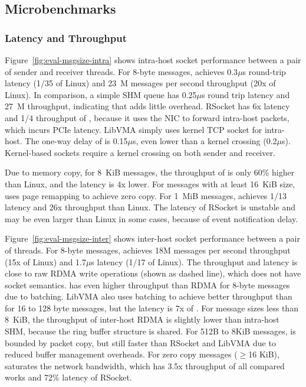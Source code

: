 \subsection{Microbenchmarks}
\label{subsec:microbenchmark}

\subsubsection{Latency and Throughput}
\quad



Figure~\ref{fig:eval-msgsize-intra} shows intra-host socket performance between a pair of sender and receiver threads.
For 8-byte messages, \sys achieves 0.3$\mu$s round-trip latency (1/35 of Linux) and 23~M messages per second throughput (20x of Linux).
In comparison, a simple SHM queue has 0.25$\mu$s round trip latency and 27~M throughput, indicating that \sys adds little overhead.
RSocket has 6x latency and 1/4 throughput of \sys{}, because it uses the NIC to forward intra-host packets, which incurs PCIe latency.
LibVMA simply uses kernel TCP socket for intra-host.
The one-way delay of \sys{} is 0.15$\mu$s, even lower than a kernel crossing (0.2$\mu$s). Kernel-based sockets require a kernel crossing on both sender and receiver.

Due to memory copy, for 8~KiB messages, the throughput of \sys is only 60\% higher than Linux, and the latency is 4x lower. For messages with at least 16~KiB size, \sys uses page remapping to achieve zero copy.
For 1~MiB messages, \sys achieves 1/13 latency and 26x throughput than Linux.
The latency of RSocket is unstable and may be even larger than Linux in some cases, because of event notification delay.


Figure~\ref{fig:eval-msgsize-inter} shows inter-host socket performance between a pair of threads.
For 8-byte messages, \sys achieves 18M messages per second throughput (15x of Linux) and 1.7$\mu$s latency (1/17 of Linux).
The throughput and latency is close to raw RDMA write operations (shown as dashed line), which does not have socket semantics.
\sys{} has even higher throughput than RDMA for 8-byte messages due to batching.
LibVMA also uses batching to achieve better throughput than \sys{} for 16 to 128 byte messages, but the latency is 7x of \sys{}.
For message sizes less than 8~KiB, the throughput of inter-host RDMA is  slightly lower than intra-host SHM, because the ring buffer structure is shared.
For 512B to 8KiB messages, \sys{} is bounded by packet copy, but still faster than RSocket and LibVMA due to reduced buffer management overheads.
For zero copy messages ($\ge$16 KiB), \sys{} saturates the network bandwidth, which has 3.5x throughput of all compared works and 72\% latency of RSocket.



